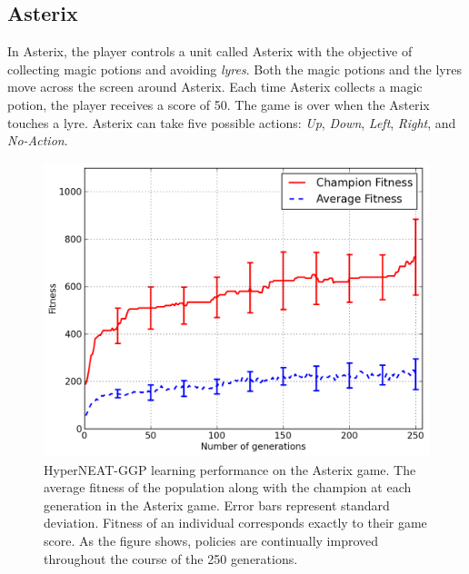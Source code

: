 \documentclass{sig-alternate}
\begin{document}
\subsection {Asterix}
In Asterix, the player controls a unit called Asterix with the objective of collecting magic potions and avoiding \textit{lyres}. Both the magic potions and the lyres move across the screen around Asterix. Each time Asterix collects a magic potion, the player receives a score of 50. The game is over when the Asterix touches a lyre. Asterix can take five possible actions: \textit{Up}, \textit{Down}, \textit{Left}, \textit{Right}, and \textit{No-Action}.

\begin{figure}[ht]
\begin{center}
\includegraphics[width=\columnwidth]{figures/asterix-results}
\end{center}
\caption{HyperNEAT-GGP learning performance on the Asterix game. The average fitness of the population along with the champion at each generation in the Asterix game. Error bars represent standard deviation. Fitness of an individual corresponds exactly to their game score. As the figure shows, policies are continually improved throughout the course of the 250 generations.}
\label{fig:asterix-curve}
\end{figure}
\end{document}
